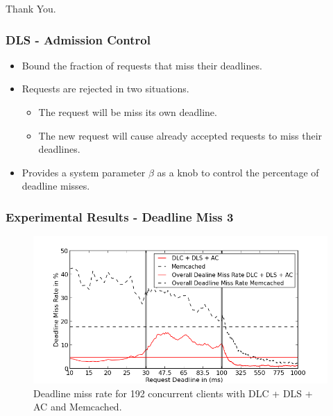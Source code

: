 \documentclass{beamer}
\begin{document}
\begin{frame}
  \centerline{Thank You.}
\end{frame}

\begin{frame}
  \frametitle{DLS - Admission Control}
  \begin{itemize}
  \item Bound the fraction of requests that miss their deadlines.
  \item Requests are rejected in two situations.
    \begin{itemize}
    \item The request will be miss its own deadline.
    \item The new request will cause already accepted requests to miss their deadlines.
    \end{itemize}
  \item Provides a system parameter $\beta$ as a knob to control the percentage
    of deadline misses.
  \end{itemize}
\end{frame}


\begin{frame}
  \frametitle{Experimental Results - Deadline Miss 3}
  \begin{figure}[t]
    \begin{center}
      \centerline{\includegraphics[scale=0.5]{img/EC2/EC2_AC_MM/miss_48.png}}
      \caption{Deadline miss rate for 192 concurrent clients with DLC + DLS + AC and Memcached.}
      \label{fig:miss_192_ac_mm}
    \end{center}
  \end{figure}
\end{frame}
\end{document}
